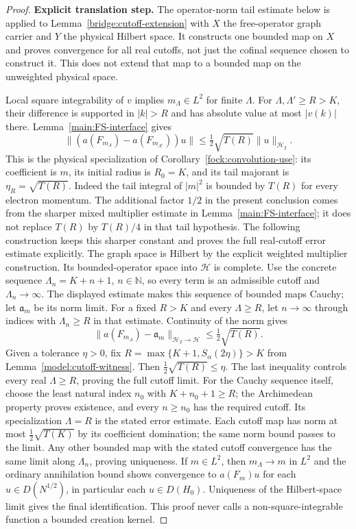 \documentclass[11pt,a4paper]{article}
\theoremstyle{definition}
\theoremstyle{remark}
\begin{document}
\begin{proof}
\noindent\textbf{Explicit translation step.} The operator-norm tail estimate below is applied to
Lemma~\ref{bridge:cutoff-extension} with $X$ the free-operator graph
carrier and $Y$ the physical Hilbert space. It constructs one bounded
map on $X$ and proves convergence for all real cutoffs, not just the
cofinal sequence chosen to construct it. This does not extend that map
to a bounded map on the unweighted physical space.

Local square integrability of $v$ implies $m_\Lambda\in L^2$ for
finite $\Lambda$. For $\Lambda,\Lambda'\geq R>K$, their difference is
supported in $|k|>R$ and has absolute value at most $|v(k)|$ there.
Lemma~\ref{main:FS-interface} gives
\[
 \|(a(F_{m_\Lambda})-a(F_{m_{\Lambda'}}))u\|
 \leq\tfrac12\sqrt{T(R)}\|u\|_{\mathcal H_2}.
\]
This is the physical specialization of
Corollary~\ref{fock:convolution-use}: its coefficient is $m$,
its initial radius is $R_0=K$, and its tail majorant is
$\eta_R=\sqrt{T(R)}$. Indeed the tail integral of $|m|^2$
is bounded by $T(R)$ for every electron momentum. The additional
factor $1/2$ in the present conclusion comes from the sharper
mixed multiplier estimate in Lemma~\ref{main:FS-interface}; it
does not replace $T(R)$ by $T(R)/4$ in that tail hypothesis.
The following construction keeps this sharper constant and proves
the full real-cutoff error estimate explicitly.
The graph space is Hilbert by the explicit weighted multiplier
construction. Its bounded-operator space into $\mathcal H$ is complete.
Use the concrete sequence $\Lambda_n=K+n+1$, $n\in\mathbb N$,
so every term is an admissible cutoff and $\Lambda_n\to\infty$.
The displayed estimate makes this sequence of bounded maps Cauchy;
let $\mathfrak a_m$ be its norm limit. For a fixed $R>K$ and
every $\Lambda\geq R$, let $n\to\infty$ through indices with
$\Lambda_n\geq R$ in that estimate. Continuity of the norm gives
\[
 \|a(F_{m_\Lambda})-\mathfrak a_m\|_{\mathcal H_2\to\mathcal H}
 \leq\tfrac12\sqrt{T(R)}.
\]
Given a tolerance $\eta>0$, fix
$R=\max\{K+1,S_\alpha(2\eta)\}>K$ from
Lemma~\ref{model:cutoff-witness}. Then
$\frac12\sqrt{T(R)}\leq\eta$. The last inequality controls
every real $\Lambda\geq R$, proving the full cutoff limit.
For the Cauchy sequence itself, choose the least natural index
$n_0$ with $K+n_0+1\geq R$; the Archimedean property proves
existence, and every $n\geq n_0$ has the required cutoff.
Its specialization $\Lambda=R$ is the stated
error estimate. Each cutoff map has norm at most
$\tfrac12\sqrt{T(K)}$ by its coefficient domination; the same
norm bound passes to the limit. Any other bounded map with the stated
cutoff convergence has the same limit along $\Lambda_n$, proving
uniqueness. If $m\in L^2$, then $m_\Lambda\to m$ in $L^2$ and the ordinary
annihilation bound shows convergence to $a(F_m)u$ for each
$u\in D(N^{1/2})$, in particular each $u\in D(H_0)$. Uniqueness of
the Hilbert-space limit gives the final identification. This proof
never calls a non-square-integrable function a bounded creation kernel.
\end{proof}
\end{document}
